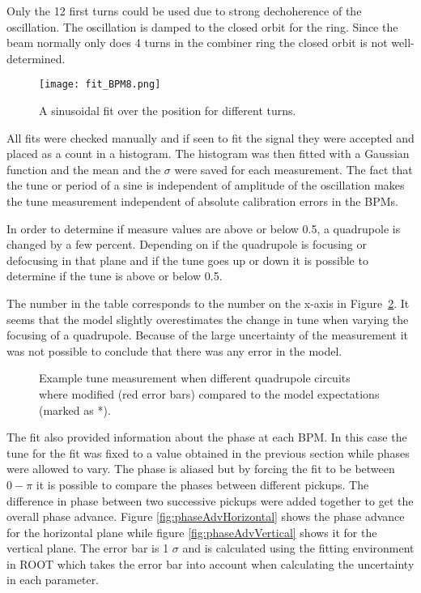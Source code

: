 Only the 12 first turns could be used due to strong dechoherence 
of the oscillation. The oscillation is damped to the closed orbit for the ring. 
Since the beam normally only does 4 turns in the combiner ring 
the closed orbit is not well-determined. 
\begin{figure}[!h]
\centering
\texttt{[image: fit\_BPM8.png]}
\caption{A sinusoidal fit over the position for different turns. \label{fig:fitOfPosition}}
\end{figure}
All fits were checked manually and if seen to fit the signal they were accepted and
placed as a count in a histogram. 
The histogram was then fitted with a Gaussian function and the mean and 
the $\sigma$ were saved for each measurement.
The fact that the tune or period of a sine is 
independent of amplitude of the oscillation makes the tune measurement 
independent of absolute calibration errors in the BPMs.
 
In order to determine if measure values are above or below 0.5, 
a quadrupole is changed by a few percent. 
Depending on if the quadrupole is focusing or 
defocusing in that plane and if the tune goes up or down it is possible to 
determine if the tune is above or below 0.5.  

The number in the table corresponds to the number on the x-axis in 
Figure~\ref{fig:tuneModelVsMeasure}.
It seems that the model slightly overestimates 
the change in tune when varying the focusing of a quadrupole.
Because of the large uncertainty of the measurement 
it was not possible to conclude that there was any error in the model.

\begin{figure}[!h]
\centering
{}
\caption{Example tune measurement when different quadrupole circuits where modified (red error bars)
compared to the model expectations (marked as *).
\label{fig:tuneModelVsMeasure}
}
\end{figure}
 

The fit also provided information about the phase at each BPM. 
In this case the tune for the fit was fixed to a value obtained in the previous section 
while phases were allowed to vary. 
The phase is aliased but by forcing the fit to be between $0 - \pi$ 
it is possible to compare the phases between different pickups. 
The difference in phase between two successive pickups were added together 
to get the overall phase advance. 
Figure \ref{fig:phaseAdvHorizontal} shows the phase advance for 
the horizontal plane while figure \ref{fig:phaseAdvVertical} shows it 
for the vertical plane. The error bar is 1 $\sigma$ and 
is calculated using the fitting environment in ROOT which takes the error bar into account
when calculating the uncertainty in each parameter.
 
